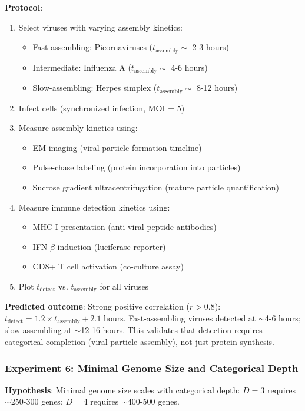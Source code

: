 \documentclass[11pt]{article}
\begin{document}
\textbf{Protocol}:
\begin{enumerate}
\item Select viruses with varying assembly kinetics:
\begin{itemize}
\item Fast-assembling: Picornaviruses ($t_{\text{assembly}} \sim$ 2-3 hours)
\item Intermediate: Influenza A ($t_{\text{assembly}} \sim$ 4-6 hours)
\item Slow-assembling: Herpes simplex ($t_{\text{assembly}} \sim$ 8-12 hours)
\end{itemize}
\item Infect cells (synchronized infection, MOI = 5)
\item Measure assembly kinetics using:
\begin{itemize}
\item EM imaging (viral particle formation timeline)
\item Pulse-chase labeling (protein incorporation into particles)
\item Sucrose gradient ultracentrifugation (mature particle quantification)
\end{itemize}
\item Measure immune detection kinetics using:
\begin{itemize}
\item MHC-I presentation (anti-viral peptide antibodies)
\item IFN-$\beta$ induction (luciferase reporter)
\item CD8+ T cell activation (co-culture assay)
\end{itemize}
\item Plot $t_{\text{detect}}$ vs. $t_{\text{assembly}}$ for all viruses
\end{enumerate}

\textbf{Predicted outcome}: Strong positive correlation ($r > 0.8$): $t_{\text{detect}} = 1.2 \times t_{\text{assembly}} + 2.1$ hours. Fast-assembling viruses detected at $\sim$4-6 hours; slow-assembling at $\sim$12-16 hours. This validates that detection requires categorical completion (viral particle assembly), not just protein synthesis.

\subsubsection{Experiment 6: Minimal Genome Size and Categorical Depth}

\textbf{Hypothesis}: Minimal genome size scales with categorical depth: $D = 3$ requires $\sim$250-300 genes; $D = 4$ requires $\sim$400-500 genes.
\end{document}
